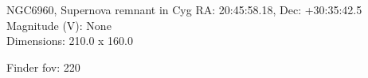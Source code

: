 \begin{block}{NGC6960, Supernova remnant in Cyg}
    RA: 20:45:58.18, Dec: +30:35:42.5 \\ 
    Magnitude (V): None \\ 
    Dimensions: 210.0 x 160.0 

    Finder fov: 220 
\end{block}